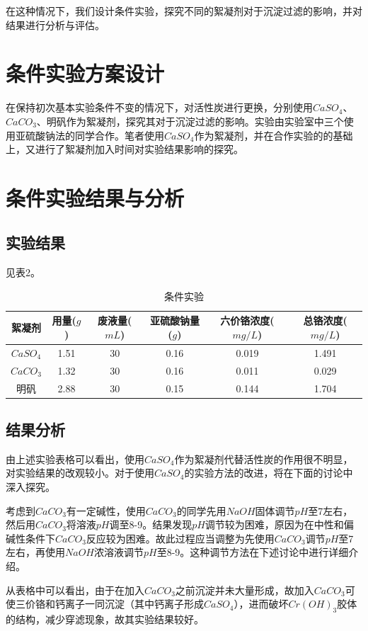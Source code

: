\documentclass[UTF8,a4paper,11pt,twocolumn]{ctexart}
\begin{document}
在这种情况下，我们设计条件实验，探究不同的絮凝剂对于沉淀过滤的影响，并对结果进行分析与评估。

\section{条件实验方案设计}
在保持初次基本实验条件不变的情况下，对活性炭进行更换，分别使用$CaSO_4$、$CaCO_3$、明矾作为絮凝剂，探究其对于沉淀过滤的影响。实验由实验室中三个使用亚硫酸钠法的同学合作。笔者使用$CaSO_4$作为絮凝剂，并在合作实验的的基础上，又进行了絮凝剂加入时间对实验结果影响的探究。

\section{条件实验结果与分析}
\subsection{实验结果}
见表2。
\begin{table}[h]
\centering
\addtolength{\tabcolsep}{-1mm}
\begin{tabular}{cccccc}
\toprule
絮凝剂&用量($g$)&废液量($mL$)&亚硫酸钠量($g$)&六价铬浓度($mg/L$)&总铬浓度($mg/L$)\\
\midrule
$CaSO_4$&1.51&30&0.16&0.019&1.491\\
$CaCO_3$&1.32&30&0.16&0.011&0.029\\
明矾&2.88&30&0.15&0.144&1.704\\
\bottomrule
\end{tabular}
\caption{条件实验}
\end{table}

\subsection{结果分析}
由上述实验表格可以看出，使用$CaSO_4$作为絮凝剂代替活性炭的作用很不明显，对实验结果的改观较小。对于使用$CaSO_4$的实验方法的改进，将在下面的讨论中深入探究。

考虑到$CaCO_3$有一定碱性，使用$CaCO_3$的同学先用$NaOH$固体调节$pH$至7左右，然后用$CaCO_3$将溶液$pH$调至8-9。结果发现$pH$调节较为困难，原因为在中性和偏碱性条件下$CaCO_3$反应较为困难。故此过程应当调整为先使用$CaCO_3$调节$pH$至7左右，再使用$NaOH$浓溶液调节$pH$至8-9。这种调节方法在下述讨论中进行详细介绍。

从表格中可以看出，由于在加入$CaCO_3$之前沉淀并未大量形成，故加入$CaCO_3$可使三价铬和钙离子一同沉淀（其中钙离子形成$CaSO_4$），进而破坏$Cr(OH)_3$胶体的结构，减少穿滤现象，故其实验结果较好。
\end{document}
